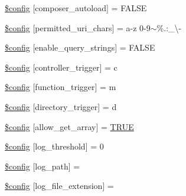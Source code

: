 \begin{DoxyCompactItemize}
\item 
\mbox{\hyperlink{application_2config_2config_8php_af175f69a791ec78be5bc6c6ecf6176e9}{\$config}} \mbox{[}\textquotesingle{}composer\+\_\+autoload\textquotesingle{}\mbox{]} = F\+A\+L\+SE
\item 
\mbox{\hyperlink{application_2config_2config_8php_a0f3f7fc5dfe7ae9b96622df2858a6c5b}{\$config}} \mbox{[}\textquotesingle{}permitted\+\_\+uri\+\_\+chars\textquotesingle{}\mbox{]} = \textquotesingle{}a-\/z 0-\/9$\sim$\%.\+:\+\_\+\textbackslash{}-\/\textquotesingle{}
\item 
\mbox{\hyperlink{application_2config_2config_8php_ae0af4957b94a8e97908013d8a34b2d58}{\$config}} \mbox{[}\textquotesingle{}enable\+\_\+query\+\_\+strings\textquotesingle{}\mbox{]} = F\+A\+L\+SE
\item 
\mbox{\hyperlink{application_2config_2config_8php_af1ca04d83f60b351122bdcc8933df731}{\$config}} \mbox{[}\textquotesingle{}controller\+\_\+trigger\textquotesingle{}\mbox{]} = \textquotesingle{}c\textquotesingle{}
\item 
\mbox{\hyperlink{application_2config_2config_8php_aed9f24c6600958d9d55acc35c1a2fbfb}{\$config}} \mbox{[}\textquotesingle{}function\+\_\+trigger\textquotesingle{}\mbox{]} = \textquotesingle{}m\textquotesingle{}
\item 
\mbox{\hyperlink{application_2config_2config_8php_aca523de0098516b35bc5fa68ce13962f}{\$config}} \mbox{[}\textquotesingle{}directory\+\_\+trigger\textquotesingle{}\mbox{]} = \textquotesingle{}d\textquotesingle{}
\item 
\mbox{\hyperlink{application_2config_2config_8php_ad899b5e4fb9873f8afcc93e4c788e11c}{\$config}} \mbox{[}\textquotesingle{}allow\+\_\+get\+\_\+array\textquotesingle{}\mbox{]} = \mbox{\hyperlink{constants_8php_ae04a3efe6aa42044f803ee90c2277846}{T\+R\+UE}}
\item 
\mbox{\hyperlink{application_2config_2config_8php_a1a167c2cf5bc9b35df3e8b47957dfe33}{\$config}} \mbox{[}\textquotesingle{}log\+\_\+threshold\textquotesingle{}\mbox{]} = 0
\item 
\mbox{\hyperlink{application_2config_2config_8php_a992a95ce2e2dc83a6a443d4828ea49f8}{\$config}} \mbox{[}\textquotesingle{}log\+\_\+path\textquotesingle{}\mbox{]} = \textquotesingle{}\textquotesingle{}
\item 
\mbox{\hyperlink{application_2config_2config_8php_a5dc1bfe6bafc81ab1f5fc8f5b2b3bc0c}{\$config}} \mbox{[}\textquotesingle{}log\+\_\+file\+\_\+extension\textquotesingle{}\mbox{]} = \textquotesingle{}\textquotesingle{}
\item 

\end{DoxyCompactItemize}
